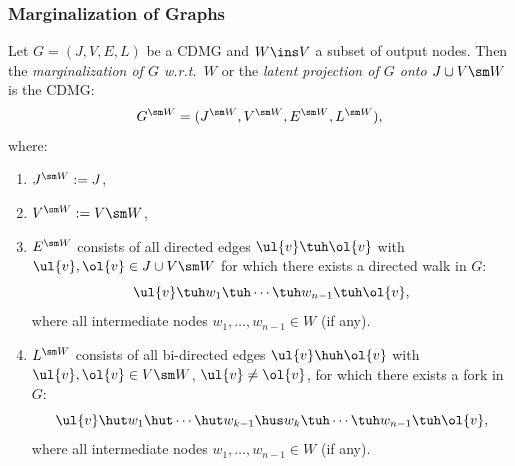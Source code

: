 \subsubsection{Marginalization of Graphs}

\begin{Def}\label{def:G_marginalization}
  Let $G=(J,V,E,L)$ be a CDMG and $W \ins V$ a subset of output nodes.
  Then the \emph{marginalization of $G$ w.r.t.\ $W$} or the \emph{latent projection of $G$ onto $J\cup V \sm W$} is the CDMG:
  \[  G^{\sm W} = (J^{\sm W},V^{\sm W},E^{\sm W},L^{\sm W}), \] 
  where:
  \begin{enumerate}[label=\roman*.)]
      \item $J^{\sm W}:= J$,
      \item $V^{\sm W}:= V \sm W$,
      \item $E^{\sm W}$ consists of all directed edges $\ul{v} \tuh \ol{v}$ with $\ul{v},\ol{v} \in J \cup V \sm W$ 
          for which there exists a directed walk in $G$:
          \[\ul{v} \tuh w_1 \tuh \cdots \tuh w_{n-1} \tuh \ol{v}, \]
          where all intermediate nodes $w_1,\dots,w_{n-1} \in W$ (if any).
      \item $L^{\sm W}$ consists of all bi-directed edges $\ul{v} \huh \ol{v}$ with 
          $\ul{v},\ol{v} \in V \sm W$, $\ul{v} \neq \ol{v}$, 
          for which there exists a fork in $G$:
          \[\ul{v} \hut w_1 \hut \cdots \hut w_{k-1} \hus w_k \tuh \cdots \tuh w_{n-1} \tuh \ol{v}, \]
          where all intermediate nodes $w_1,\dots,w_{n-1} \in W$ (if any).
  \end{enumerate}
\end{Def}


